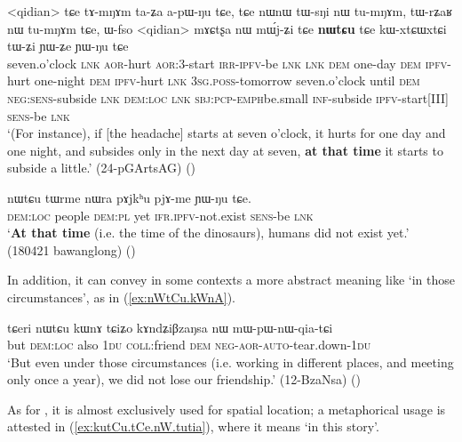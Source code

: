 \begin{exe}
\ex \label{ex:nWtCu.temporal}
\gll <qidian> tɕe tɤ-mŋɤm ta-ʑa a-pɯ-ŋu tɕe, tɕe nɯnɯ tɯ-sŋi nɯ tu-mŋɤm, tɯ-rʑaʁ nɯ tu-mŋɤm tɕe, ɯ-fso <qidian> mɤɕtʂa nɯ mɯ́j-ʑi tɕe \textbf{nɯtɕu} tɕe kɯ-xtɕɯ\redp{}xtɕi tɯ-ʑi ɲɯ-ʑe ɲɯ-ŋu tɕe \\
seven.o'clock \textsc{lnk} \textsc{aor}-hurt \textsc{aor}:3\flobv{}-start \textsc{irr}-\textsc{ipfv}-be \textsc{lnk} \textsc{lnk} \textsc{dem} one-day \textsc{dem} \textsc{ipfv}-hurt  one-night \textsc{dem} \textsc{ipfv}-hurt  \textsc{lnk}  \textsc{3sg}.\textsc{poss}-tomorrow seven.o'clock until \textsc{dem} \textsc{neg}:\textsc{sens}-subside \textsc{lnk} \textsc{dem}:\textsc{loc} \textsc{lnk} \textsc{sbj}:\textsc{pcp}-\textsc{emph}\redp{}be.small \textsc{inf}-subside \textsc{ipfv}-start[III] \textsc{sens}-be \textsc{lnk} \\
\glt `(For instance), if [the headache] starts at seven o'clock, it hurts for one day and one night, and subsides only in the next day at seven, \textbf{at that time} it starts to subside a little.' (24-pGArtsAG)
()
\end{exe}

\begin{exe}
\ex \label{ex:nWtCu.temporal2}
\gll  nɯtɕu tɯrme nɯra pɤjkʰu pjɤ-me ɲɯ-ŋu tɕe. \\
\textsc{dem}:\textsc{loc} people \textsc{dem}:\textsc{pl} yet \textsc{ifr}.\textsc{ipfv}-not.exist \textsc{sens}-be \textsc{lnk}  \\
\glt `\textbf{At that time} (i.e. the time of the dinosaurs), humans did not exist yet.' (180421 bawanglong)
()
\end{exe}

In addition, it can convey in some contexts a more abstract meaning like `in those circumstances', as in (\ref{ex:nWtCu.kWnA}).

\begin{exe}
\ex \label{ex:nWtCu.kWnA}
\gll tɕeri nɯtɕu kɯnɤ tɕiʑo kɤndʑiβzaŋsa nɯ mɯ-pɯ-nɯ-qia-tɕi \\
but \textsc{dem}:\textsc{loc} also \textsc{1du} \textsc{coll}:friend \textsc{dem} \textsc{neg}-\textsc{aor}-\textsc{auto}-tear.down-\textsc{1du} \\
\glt `But even under those circumstances (i.e. working in different places, and meeting only once a year), we did not lose our friendship.' (12-BzaNsa) ()
\end{exe}

As for , it is almost exclusively used for spatial location; a metaphorical usage is attested in (\ref{ex:kutCu.tCe.nW.tutia}), where it means `in this story'.

